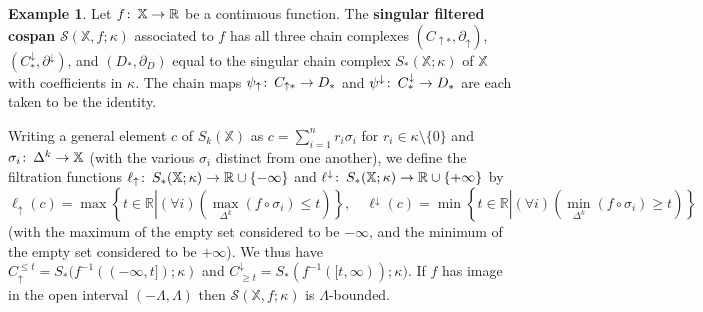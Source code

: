 \documentclass[11pt]{amsart}
\theoremstyle{definition}
\newtheorem{ex}[theorem]{Example}
\theoremstyle{remark}
\numberwithin{equation}{section}
\def\co{\colon\thinspace}
\def\R{\mathbb{R}}
\begin{document}
\begin{ex}\label{singular}
	Let $f\co \mathbb{X}\to  \R$ be a continuous function.  The \textbf{singular filtered cospan} $\mathcal{S}(\mathbb{X},f;\kappa)$ associated to $f$ has all three chain complexes $(C_{\uparrow *},\partial_{\uparrow})$, $(C^{\downarrow}_{*},\partial^{\downarrow})$, and $(D_*,\partial_D)$ equal to the singular chain complex $S_*(\mathbb{X};\kappa)$ of $\mathbb{X}$ with coefficients in $\kappa$.  The chain maps $\psi_{\uparrow}\co C_{\uparrow *}\to D_*$ and $\psi^{\downarrow}\co C^{\downarrow}_{*}\to D_*$ are each taken to be the identity.  
	
	Writing a general element $c$ of $S_k(\mathbb{X})$ as $c=\sum_{i=1}^{n}  r_i\sigma_i$ for $r_i\in \kappa\setminus \{0\}$ and $\sigma_i\co \Delta^k\to \mathbb{X}$ (with the various $\sigma_i$ distinct from one another), we define the filtration functions $\ell_{\uparrow}\co S_*(\mathbb{X};\kappa)\to \R\cup\{-\infty\}$ and $\ell^{\downarrow}\co S_*(\mathbb{X};\kappa)\to \R\cup \{+\infty\}$ by \[ \ell_{\uparrow}(c)=\max\left\{t\in \R\left|(\forall i)\left(\max_{\Delta^k}(f\circ\sigma_i)\leq t\right)\right.\right\},\quad \ell^{\downarrow}(c)=\min\left\{t\in\R\left|(\forall i)\left(\min_{\Delta^k}(f\circ\sigma_i)\geq t\right)\right.\right\} \] (with the maximum of the empty set considered to be $-\infty$, and the minimum of the empty set considered to be $+\infty$). 
	We thus have $C_{\uparrow }^{\leq t}=S_*(f^{-1}((-\infty,t]);\kappa)$ and $C^{\downarrow}_{\geq t}=S_*(f^{-1}([t,\infty));\kappa)$. If $f$ has image in the open interval $(-\Lambda,\Lambda)$ then $\mathcal{S}(\mathbb{X},f;\kappa)$ is $\Lambda$-bounded.
\end{ex}
\end{document}

